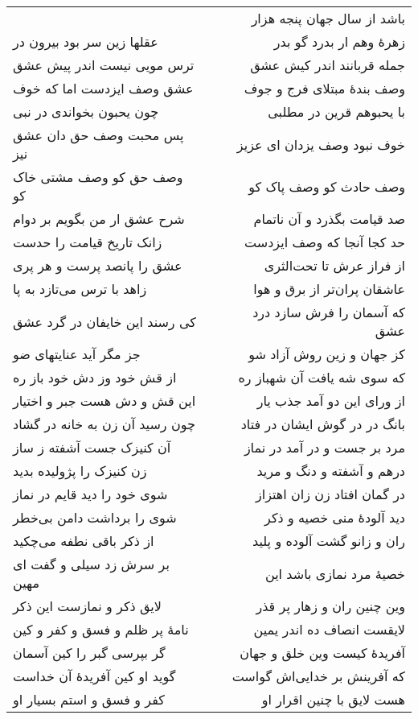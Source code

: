 \begin{center}
\begin{longtable}{l p{0.5cm} r}
&&
باشد از سال جهان پنجه هزار
\\
عقلها زین سر بود بیرون در
&&
زهرهٔ وهم ار بدرد گو بدر
\\
ترس مویی نیست اندر پیش عشق
&&
جمله قربانند اندر کیش عشق
\\
عشق وصف ایزدست اما که خوف
&&
وصف بندهٔ مبتلای فرج و جوف
\\
چون یحبون بخواندی در نبی
&&
با یحبوهم قرین در مطلبی
\\
پس محبت وصف حق دان عشق نیز
&&
خوف نبود وصف یزدان ای عزیز
\\
وصف حق کو وصف مشتی خاک کو
&&
وصف حادث کو وصف پاک کو
\\
شرح عشق ار من بگویم بر دوام
&&
صد قیامت بگذرد و آن ناتمام
\\
زانک تاریخ قیامت را حدست
&&
حد کجا آنجا که وصف ایزدست
\\
عشق را پانصد پرست و هر پری
&&
از فراز عرش تا تحت‌الثری
\\
زاهد با ترس می‌تازد به پا
&&
عاشقان پران‌تر از برق و هوا
\\
کی رسند این خایفان در گرد عشق
&&
که آسمان را فرش سازد درد عشق
\\
جز مگر آید عنایتهای ضو
&&
کز جهان و زین روش آزاد شو
\\
از قش خود وز دش خود باز ره
&&
که سوی شه یافت آن شهباز ره
\\
این قش و دش هست جبر و اختیار
&&
از ورای این دو آمد جذب یار
\\
چون رسید آن زن به خانه در گشاد
&&
بانگ در در گوش ایشان در فتاد
\\
آن کنیزک جست آشفته ز ساز
&&
مرد بر جست و در آمد در نماز
\\
زن کنیزک را پژولیده بدید
&&
درهم و آشفته و دنگ و مرید
\\
شوی خود را دید قایم در نماز
&&
در گمان افتاد زن زان اهتزاز
\\
شوی را برداشت دامن بی‌خطر
&&
دید آلودهٔ منی خصیه و ذکر
\\
از ذکر باقی نطفه می‌چکید
&&
ران و زانو گشت آلوده و پلید
\\
بر سرش زد سیلی و گفت ای مهین
&&
خصیهٔ مرد نمازی باشد این
\\
لایق ذکر و نمازست این ذکر
&&
وین چنین ران و زهار پر قذر
\\
نامهٔ پر ظلم و فسق و کفر و کین
&&
لایقست انصاف ده اندر یمین
\\
گر بپرسی گبر را کین آسمان
&&
آفریدهٔ کیست وین خلق و جهان
\\
گوید او کین آفریدهٔ آن خداست
&&
که آفرینش بر خدایی‌اش گواست
\\
کفر و فسق و استم بسیار او
&&
هست لایق با چنین اقرار او

\end{longtable}
\end{center}

